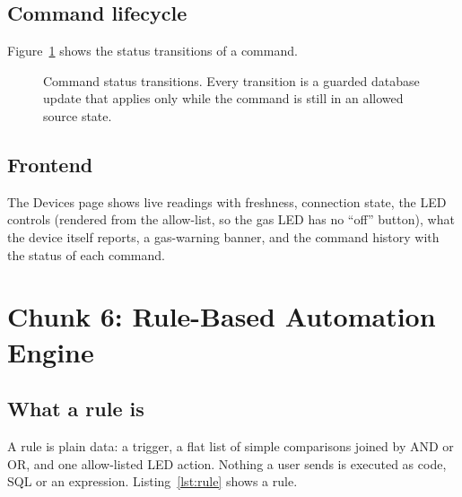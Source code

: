 \documentclass[12pt,a4paper,oneside]{report}
\begin{document}
\subsection{Command lifecycle}
Figure~\ref{fig:cmd-lifecycle} shows the status transitions of a command.
\begin{figure}[H]
\centering
{}
\caption{Command status transitions. Every transition is a guarded database update that applies only while the command is still in an allowed source state.}
\label{fig:cmd-lifecycle}
\end{figure}

\subsection{Frontend}
The Devices page shows live readings with freshness, connection state, the LED controls (rendered from the allow-list, so the gas LED has no ``off'' button), what the device itself reports, a gas-warning banner, and the command history with the status of each command.

\section{Chunk 6: Rule-Based Automation Engine}
\subsection{What a rule is}
A rule is plain data: a trigger, a flat list of simple comparisons joined by AND or OR, and one allow-listed LED action. Nothing a user sends is executed as code, SQL or an expression. Listing~\ref{lst:rule} shows a rule.
\end{document}
